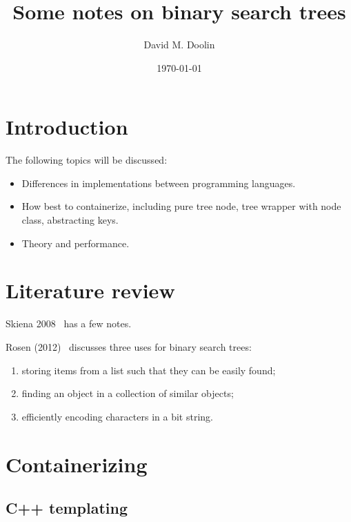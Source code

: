 \documentclass{article}
\title{Some notes on binary search trees}
\date{\today}
\author{David M. Doolin}
\begin{document}
\maketitle




\section{Introduction}


The following topics will be discussed:

\begin{itemize}

\item Differences in implementations between programming languages.
\item How best to containerize, including pure tree node, tree wrapper with
node class, abstracting keys.
\item Theory and performance.

\end{itemize}


\section{Literature review}

Skiena 2008~\cite{[pp. 77, 370, 375, 589]skiena} has a few notes.


Rosen (2012)~\cite[pp. 757-760]{rosen} discusses three uses for binary search trees:

\begin{enumerate}
\item storing items from a list such that they can be easily found;
\item finding an object in a collection of similar objects;
\item efficiently encoding characters in a bit string.
\end{enumerate}

\section{Containerizing}

\subsection{C++ templating}
\end{document}
